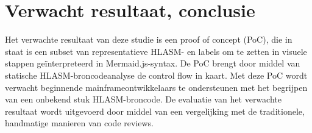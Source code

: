 
\section{Verwacht resultaat, conclusie}%
\label{sec:verwachte_resultaten}

Het verwachte resultaat van deze studie is een proof of concept (PoC), die in staat is een subset van representatieve HLASM- en labels om te zetten in visuele stappen geïnterpreteerd in Mermaid.js-syntax. De PoC brengt door middel van statische HLASM-broncodeanalyse de control flow in kaart. 
Met deze PoC wordt verwacht beginnende mainframeontwikkelaars te ondersteunen met het begrijpen van een onbekend stuk HLASM-broncode. De evaluatie van het verwachte resultaat wordt uitgevoerd door middel van een vergelijking met de traditionele, handmatige manieren van code reviews.




